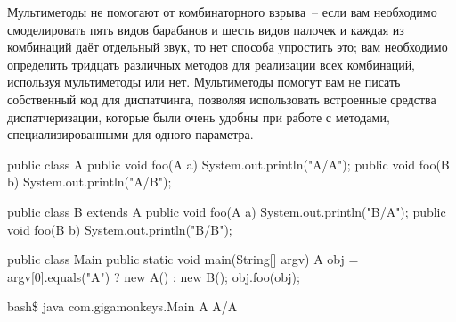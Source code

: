 Мультиметоды не помогают от комбинаторного взрыва~-- если вам необходимо смоделировать
пять видов барабанов и шесть видов палочек и каждая из комбинаций даёт отдельный звук, то
нет способа упростить это; вам необходимо определить тридцать различных методов для
реализации всех комбинаций, используя мультиметоды или нет.  Мультиметоды помогут вам не
писать собственный код для диспатчинга, позволяя использовать встроенные средства
диспатчеризации, которые были очень удобны при работе с методами, специализированными для
одного параметра.

\begin{lrbox}{\chonesixone}
  \begin{minipage}{\linewidth}
\begin{myverb}
public class A {
  public void foo(A a) { System.out.println("A/A"); }
  public void foo(B b) { System.out.println("A/B"); }
}

public class B extends A {
  public void foo(A a) { System.out.println("B/A"); }
  public void foo(B b) { System.out.println("B/B"); }
}
\end{myverb}
  \end{minipage}
\end{lrbox}

\begin{lrbox}{\chonesixtwo}
  \begin{minipage}{\linewidth}
\begin{myverb}
public class Main {
  public static void main(String[] argv) {
    A obj = argv[0].equals("A") ? new A() : new B();
    obj.foo(obj);
  }
}
\end{myverb}
  \end{minipage}
\end{lrbox}

\begin{lrbox}{\chonesixthree}
  \begin{minipage}{\linewidth}
\begin{myverb}
bash\$ java com.gigamonkeys.Main A
A/A
\end{myverb}
  \end{minipage}
\end{lrbox}

